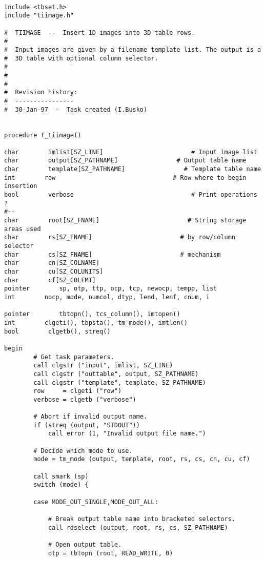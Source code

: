 \begin{verbatim}

include <tbset.h>
include "tiimage.h"

#  TIIMAGE  --  Insert 1D images into 3D table rows.
#
#  Input images are given by a filename template list. The output is a 
#  3D table with optional column selector. 
#
#
#
#  Revision history:
#  ----------------
#  30-Jan-97  -  Task created (I.Busko)


procedure t_tiimage()

char        imlist[SZ_LINE]                        # Input image list
char        output[SZ_PATHNAME]                # Output table name
char        template[SZ_PATHNAME]                # Template table name
int        row                                # Row where to begin insertion
bool        verbose                                # Print operations ?
#--
char        root[SZ_FNAME]                        # String storage areas used
char        rs[SZ_FNAME]                        # by row/column selector
char        cs[SZ_FNAME]                        # mechanism
char        cn[SZ_COLNAME]
char        cu[SZ_COLUNITS]
char        cf[SZ_COLFMT]
pointer        sp, otp, ttp, ocp, tcp, newocp, tempp, list
int        nocp, mode, numcol, dtyp, lend, lenf, cnum, i

pointer        tbtopn(), tcs_column(), imtopen()
int        clgeti(), tbpsta(), tm_mode(), imtlen()
bool        clgetb(), streq()

begin
        # Get task parameters.
        call clgstr ("input", imlist, SZ_LINE)
        call clgstr ("outtable", output, SZ_PATHNAME)
        call clgstr ("template", template, SZ_PATHNAME)
        row     = clgeti ("row")
        verbose = clgetb ("verbose")

        # Abort if invalid output name.
        if (streq (output, "STDOUT"))
            call error (1, "Invalid output file name.")

        # Decide which mode to use.
        mode = tm_mode (output, template, root, rs, cs, cn, cu, cf)

        call smark (sp)
        switch (mode) {

        case MODE_OUT_SINGLE,MODE_OUT_ALL:

            # Break output table name into bracketed selectors.
            call rdselect (output, root, rs, cs, SZ_PATHNAME)

            # Open output table.
            otp = tbtopn (root, READ_WRITE, 0)


\end{verbatim}
